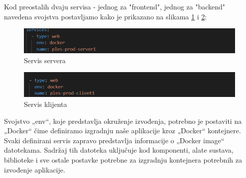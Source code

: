 Kod preostalih dvaju servisa - jednog za "frontend", jednog za "backend" navedena svojstva postavljamo kako je prikazano na slikama \ref{fig:ServerServis} i \ref{fig:ClientServis}:

\begin{figure}[H]
			\includegraphics[scale=0.9]{slike/Slika3.PNG} %
			\centering
			\caption{Servis servera}
			\label{fig:ServerServis}
		\end{figure}

\begin{figure}[H]
			\includegraphics[scale=0.9]{slike/Slika4.PNG} %
			\centering
			\caption{Servis klijenta}
			\label{fig:ClientServis}
		\end{figure}

Svojstvo „env“, koje predstavlja okruženje izvođenja, potrebno je postaviti na „Docker“ čime definiramo izgradnju naše aplikacije kroz „Docker“ kontejnere.
Svaki definirani servis zapravo predstavlja informacije o „Docker image“ datotekama. Sadržaj tih datoteka uključuje kod komponenti, alate sustava, biblioteke i sve ostale postavke potrebne za izgradnju kontejnera potrebnih za izvođenje aplikacije.

